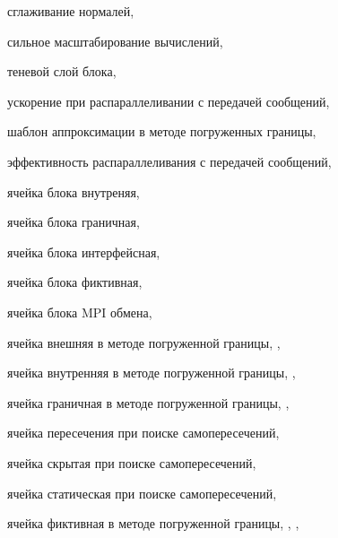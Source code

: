 сглаживание нормалей, \pageref{term:smooth_norm}

сильное масштабирование вычислений, \pageref{term:strong_scale}

теневой слой блока, \pageref{term:block_shadow_layer}

ускорение при распараллеливании с передачей сообщений, \pageref{term:msg_speedup}

шаблон аппроксимации в методе погруженных границы, \pageref{term:ibm_template}

эффективность распараллеливания с передачей сообщений, \pageref{term:msg_eff}

ячейка блока внутреняя, \pageref{term:cell_block_inner}

ячейка блока граничная, \pageref{term:cell_block_border}

ячейка блока интерфейсная, \pageref{term:cell_block_interface}

ячейка блока фиктивная, \pageref{term:cell_block_ghost}

ячейка блока MPI обмена, \pageref{term:cell_block_mpi}

ячейка внешняя в методе погруженной границы, \pageref{term:cell_ibm_outer}, \pageref{term:cell_ibm_outer2}

ячейка внутренняя в методе погруженной границы, \pageref{term:cell_ibm_innner}, \pageref{term:cell_ibm_innner2}

ячейка граничная в методе погруженной границы, \pageref{term:cell_ibm_border}, \pageref{term:cell_ibm_border2}

ячейка пересечения при поиске самопересечений, \pageref{term:cell_intersect}

ячейка скрытая при поиске самопересечений, \pageref{term:cell_hidden}

ячейка статическая при поиске самопересечений, \pageref{term:cell_static}

ячейка фиктивная в методе погруженной границы, \pageref{term:cell_ibm_ghost}, \pageref{term:cell_ibm_ghost2}, \pageref{term:cell_ibm_ghost3}
